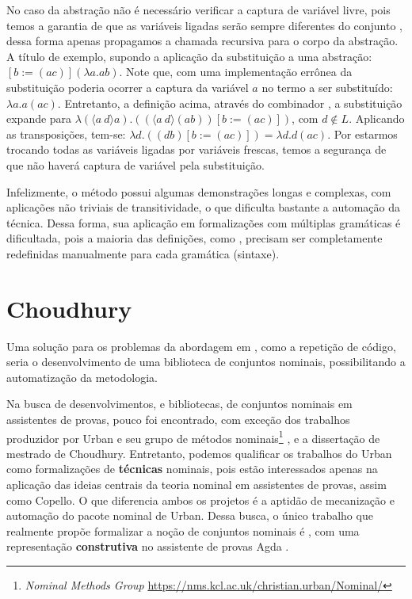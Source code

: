 No caso da abstração não é necessário verificar a captura de variável livre, pois temos a garantia de que as variáveis ligadas serão sempre diferentes do conjunto , dessa forma apenas propagamos a chamada recursiva para o corpo da abstração. A título de exemplo, supondo a aplicação da substituição a uma abstração: $[b := (ac)](\lambda a . ab)$. Note que, com uma implementação errônea da substituição poderia ocorrer a captura da variável $a$ no termo a ser substituído: $\lambda a . a(ac)$. Entretanto, a definição acima, através do combinador , a substituição expande para $\lambda (\langle a~d \rangle a) . ((\langle a~d \rangle (ab))[b := (ac)])$, com $d \notin L$. Aplicando as transposições, tem-se: $\lambda d . ((db)[b := (ac)]) = \lambda d . d(ac)$. Por estarmos trocando todas as variáveis ligadas por variáveis frescas, temos a segurança de que não haverá captura de variável pela substituição. 

Infelizmente, o método possui algumas demonstrações longas e complexas, com aplicações não triviais de transitividade, o que dificulta bastante a automação da técnica. Dessa forma, sua aplicação em formalizações com múltiplas gramáticas é dificultada, pois a maioria das definições, como , precisam ser completamente redefinidas manualmente para cada gramática (sintaxe).

\section{Choudhury}\label{sec:choudhury}
Uma solução para os problemas da abordagem em \cite{Copello2016}, como a repetição de código, seria o desenvolvimento de uma biblioteca de conjuntos nominais, possibilitando a automatização da metodologia.

Na busca de desenvolvimentos, e bibliotecas, de conjuntos nominais em assistentes de provas, pouco foi encontrado, com exceção dos trabalhos produzidor por Urban e seu grupo de métodos nominais\footnote{\textit{Nominal Methods Group} \url{https://nms.kcl.ac.uk/christian.urban/Nominal/}} \cite{Urban2008,Urban2005,Urban2006,Huffman2010,Urban2011}, e a dissertação de mestrado de Choudhury\cite{Choudhury2015}. Entretanto,
podemos qualificar os trabalhos do Urban como formalizações de \textbf{técnicas} nominais, pois estão interessados apenas na aplicação das ideias centrais da teoria nominal em assistentes de provas, assim como Copello. O que diferencia ambos os projetos é a aptidão de mecanização e automação do pacote nominal de Urban. Dessa busca, o único trabalho que realmente propõe formalizar a noção de conjuntos nominais é \cite{Choudhury2015}, com uma representação \textbf{construtiva} no assistente de provas Agda \cite{Bove2009}.

